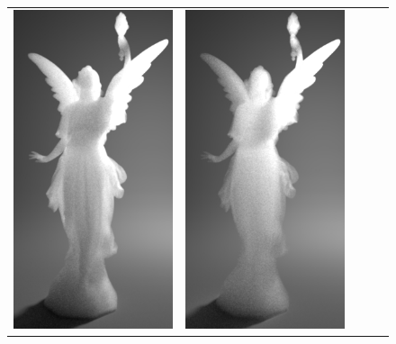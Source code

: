 \begin{figure}
\begin{tabular}{ccccc}
		\includegraphics[height=\resLen]{images/lucy/N100_400nm.jpg} &
		\includegraphics[height=\resLen]{images/lucy/N500_400nm.jpg}
		\\

\end{tabular}
\end{figure}
